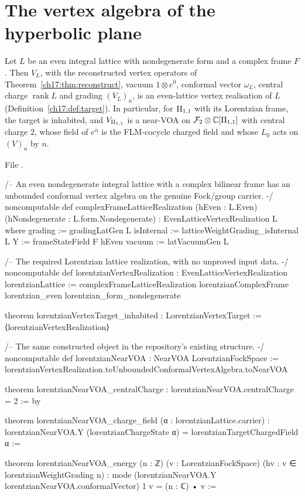 \section{The vertex algebra of the hyperbolic plane}\label{ch17:sec:realization}

\begin{theorem}\label{ch17:thm:realization}
Let $L$ be an even integral lattice with nondegenerate form and a complex frame $F$.  Then $V_L$, with the
reconstructed vertex operators of Theorem~\ref{ch17:thm:reconstruct}, vacuum $1\otimes e^0$, conformal vector
$\omega_L$, central charge $\operatorname{rank}L$ and grading $(V_L)_n$, is an even-lattice vertex realisation of
$L$ (Definition~\ref{ch17:def:target}).  In particular, for ${\mathrm{II}_{1,1}}$ with its Lorentzian frame, the target
 is inhabited, and ${V_{\mathrm{II}_{1,1}}}$ is a near-VOA
 on $\mathcal{F}_2\otimes{\mathbb{C}}[{\mathrm{II}_{1,1}}]$ with central charge $2$, whose field of $e^\alpha$ is the
FLM-cocycle charged field and whose $L_0$ acts on $(V)_n$ by $n$.
\end{theorem}

\noindent File .
\begin{leancode}
/-- An even nondegenerate integral lattice with a complex bilinear frame has
an unbounded conformal vertex algebra on the genuine Fock/group carrier. -/
noncomputable def complexFrameLatticeRealization (hEven : L.Even)
    (hNondegenerate : L.form.Nondegenerate) : EvenLatticeVertexRealization L where
  grading := gradingLatGen L
  isInternal := latticeWeightGrading_isInternal L
  Y := frameStateField F hEven
  vacuum := latVacuumGen L

/-- The required Lorentzian lattice realization, with no unproved input data. -/
noncomputable def lorentzianVertexRealization : EvenLatticeVertexRealization lorentzianLattice :=
  complexFrameLatticeRealization lorentzianComplexFrame lorentzian_even lorentzian_form_nondegenerate

theorem lorentzianVertexTarget_inhabited : LorentzianVertexTarget :=
  ⟨lorentzianVertexRealization⟩

/-- The same constructed object in the repository's existing structure. -/
noncomputable def lorentzianNearVOA : NearVOA LorentzianFockSpace :=
  lorentzianVertexRealization.toUnboundedConformalVertexAlgebra.toNearVOA

theorem lorentzianNearVOA_centralCharge : lorentzianNearVOA.centralCharge = 2 := by

theorem lorentzianNearVOA_charge_field (α : lorentzianLattice.carrier) :
    lorentzianNearVOA.Y (lorentzianChargeState α) = lorentzianTargetChargedField α :=

theorem lorentzianNearVOA_energy (n : ℤ) (v : LorentzianFockSpace)
    (hv : v ∈ lorentzianWeightGrading n) :
    mode (lorentzianNearVOA.Y lorentzianNearVOA.conformalVector) 1 v = (n : ℂ) • v :=
\end{leancode}

